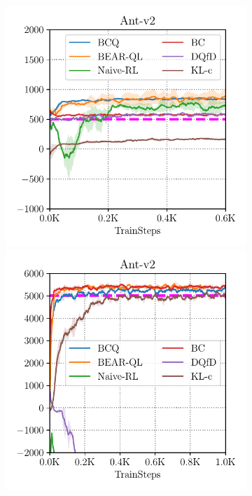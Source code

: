 \begin{figure}
\begin{subfigure}[t]{0.23\textwidth}
    \end{subfigure}
    ~
    \begin{subfigure}[t]{0.23\textwidth}
        \centering
        \includegraphics[width=0.99\linewidth]{chapters/bear/images/images_camera_ready/ant_random_camera_ready.pdf}
        \includegraphics[width=0.99\linewidth]{chapters/bear/images/images_camera_ready/ant_optimal_camera_ready.pdf}

\end{subfigure}
\end{figure}
